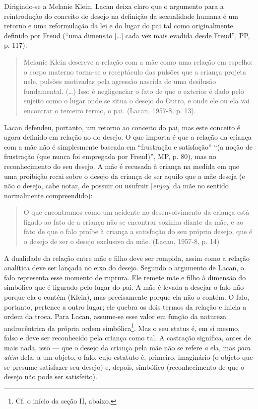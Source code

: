 Dirigindo-se a Melanie Klein, Lacan deixa claro que o argumento para a
reintrodução do conceito de desejo na definição da sexualidade humana é
um retorno e uma reformulação da lei e do lugar do pai tal como
originalmente definido por Freud (``uma dimensão {[}\ldots{}{]} cada vez mais
evadida desde Freud'', PP, p. 117):

\begin{quote}
Melanie Klein descreve a relação com a mãe como uma relação em espelho:
o corpo materno torna-se o receptáculo das pulsões que a criança projeta
nele, pulsões motivadas pela agressão nascida de uma desilusão
fundamental. (\ldots{}) Isso é negligenciar o fato de que o exterior é dado
pelo sujeito como o lugar onde se situa o desejo do Outro, e onde ele ou
ela vai encontrar o terceiro termo, o pai. (Lacan, 1957-8, p. 13).
\end{quote}

Lacan defendeu, portanto, um retorno ao conceito do pai, mas este
conceito é agora definido em relação ao do desejo. O que importa é que a
relação da criança com a mãe não é simplesmente baseada em ``frustração e
satisfação'' ``(a noção de frustração (que nunca foi empregada por %
Freud)'', MP, p. 80), mas no reconhecimento do seu desejo. A mãe é
recusada à criança na medida em que uma proibição recai sobre o desejo
da criança de ser aquilo que a mãe deseja (e não o desejo, cabe notar,
de possuir ou usufruir {[}\emph{enjoy}{]} da mãe no sentido normalmente
compreendido):

\begin{quote}
O que encontramos como um acidente no desenvolvimento da criança está
ligado ao fato de a criança não se encontrar sozinha diante da mãe, e ao
fato de que o falo proíbe à criança a satisfação do seu próprio desejo,
que é o desejo de ser o desejo exclusivo da mãe. (Lacan, 1957-8, p. 14)
\end{quote}

A dualidade da relação entre mãe e filho deve ser rompida, assim como a
relação analítica deve ser lançada no eixo do desejo. Segundo o
argumento de Lacan, o falo representa esse momento de ruptura. Ele
remete mãe e filho à dimensão do simbólico que é figurado pelo lugar do
pai. A mãe é levada a desejar o falo não porque ela o contém (Klein),
mas precisamente porque ela não o contém. O falo, portanto, pertence a
outro lugar; ele quebra os dois termos da relação e inicia a ordem da
troca. Para Lacan, assume-se esse valor em função da natureza
androcêntrica da própria ordem simbólica\footnote{Cf. o início da seção
  II, abaixo.}. Mas o seu status é, em si mesmo, falso e deve ser
reconhecido pela criança como tal. A castração significa, antes de mais
nada, isso --- que o desejo da criança pela mãe não se refere \emph{a}
ela, mas \emph{para} \emph{além} dela, a um objeto, o falo, cujo
estatuto é, primeiro, imaginário (o objeto que se presume satisfazer seu
desejo) e, depois, simbólico (reconhecimento de que o desejo não pode
ser satisfeito).

